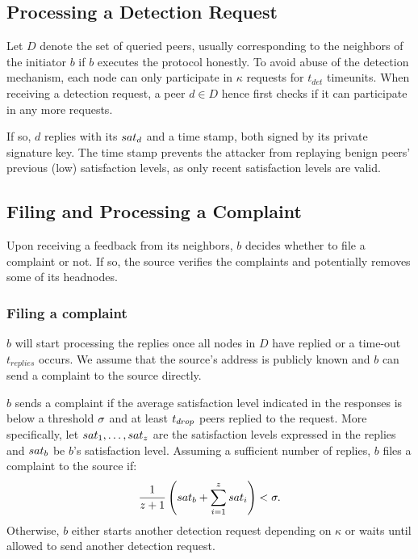 \subsection{Processing a Detection Request}
Let $D$ denote the set of queried peers, usually corresponding to the neighbors of the initiator $b$ if $b$ executes the protocol honestly.  
To avoid abuse of the detection mechanism, each node can only participate in $\kappa$ requests for $t_{det}$ timeunits. 
When receiving a detection request, a peer $d \in D$ hence first checks if it can participate in any more requests. 
    
If so, $d$ replies with its $sat_d$ and a time stamp, both signed by its private signature key. 
The time stamp prevents the attacker from replaying benign peers' previous (low) satisfaction levels, as only recent satisfaction levels are valid.


\subsection{Filing and Processing a Complaint}

Upon receiving a feedback from its neighbors, $b$ decides whether to file a complaint or not.
If so, the source verifies the complaints and potentially removes some of its headnodes. 

\subsubsection*{Filing a complaint}
$b$ will start processing the replies once all nodes in $D$ have replied or a time-out $t_{replies}$ occurs. 
We assume that the source's address is publicly known and $b$ can send a complaint to the source directly.

$b$ sends a complaint if the average satisfaction level indicated in the responses is below a threshold $\sigma$ and at least $t_{drop}$ peers replied to the request. 
More specifically, let $sat_1, \ldots ,sat_z$ are the satisfaction levels expressed in the replies and $sat_b$ be $b$'s satisfaction level. 
Assuming a sufficient number of replies, $b$ files a complaint to the source if:
\begin{align}
\label{eq:drop_satis_equation}
\frac{1}{z+1}\left( \sat_b + \sum_{i=1}^{z} \sat_i \right) < \satThres. 
\end{align} 
Otherwise, $b$ either starts another detection request depending on $\kappa$ or waits until allowed to send another detection request.
 

